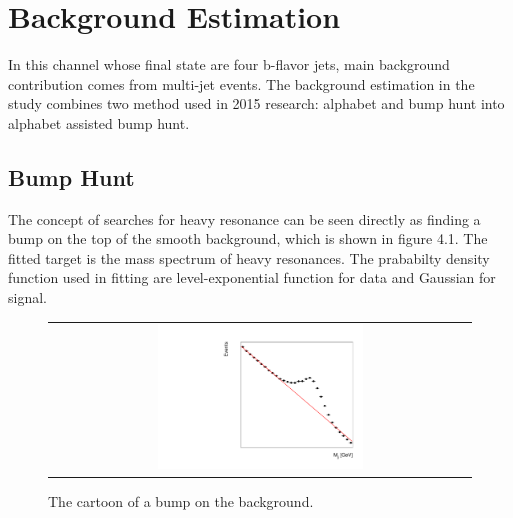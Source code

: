 
\chapter{Background Estimation} \label{Background}
In this channel whose final state are four b-flavor jets, main background contribution comes from multi-jet events.
The background estimation in the study combines two method used in 2015 research: alphabet and bump hunt into alphabet assisted bump hunt\citep{CMS-PAS-B2G-16-008}.
 

\section{Bump Hunt}
The concept of searches for heavy resonance can be seen directly as finding a bump on the top of the smooth background, which is shown in figure 4.1. The fitted target is the mass spectrum of heavy resonances. The prababilty density function used in fitting are level-exponential function for data and Gaussian for signal.
\begin{figure}[t]
  \centering
  \begin{tabular}{c}
    \includegraphics[width=0.5\textwidth]{Figures/cart.pdf} 
   
  \end{tabular}
  \caption{The cartoon of a bump on the background.}
  \label{fig:hvt_brs}
\end{figure}

